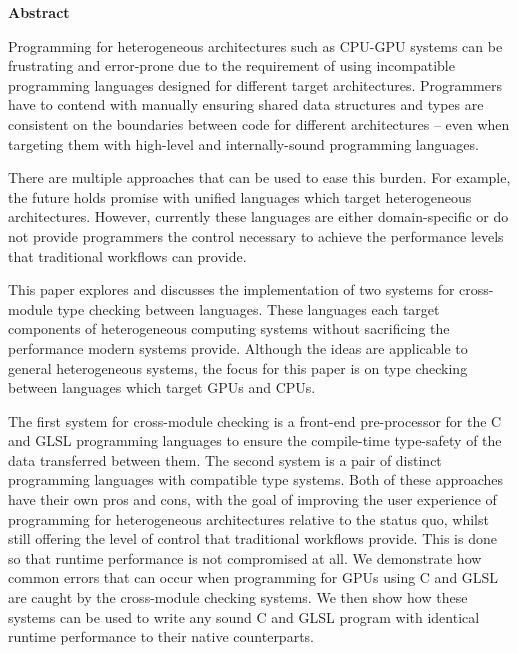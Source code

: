 \newpage
{\Huge \bf Abstract}
\vspace{24pt}






Programming for heterogeneous architectures such as CPU-GPU systems can be
frustrating and error-prone due to the requirement of using incompatible
programming languages designed for different target architectures. Programmers
have to contend with manually ensuring shared data structures and types are
consistent on the boundaries between code for different architectures -- even
when targeting them with high-level and internally-sound programming languages.

There are multiple approaches that can be used to ease this burden. For
example, the future holds promise with unified languages which target
heterogeneous architectures. However, currently these languages are either
domain-specific or do not provide programmers the control necessary to achieve
the performance levels that traditional workflows can provide.

This paper explores and discusses the implementation of two systems for
cross-module type checking between languages. These languages each target
components of heterogeneous computing systems without sacrificing the
performance modern systems provide. Although the ideas are applicable to
general heterogeneous systems, the focus for this paper is on type checking
between languages which target GPUs and CPUs.

The first system for cross-module checking is a front-end pre-processor for the
C and GLSL programming languages to ensure the compile-time type-safety of the
data transferred between them. The second system is a pair of distinct
programming languages with compatible type systems. Both of these approaches
have their own pros and cons, with the goal of improving the user experience of
programming for heterogeneous architectures relative to the status quo, whilst
still offering the level of control that traditional workflows provide. This is
done so that runtime performance is not compromised at all. We demonstrate how
common errors that can occur when programming for GPUs using C and GLSL are
caught by the cross-module checking systems. We then show how these systems can
be used to write any sound C and GLSL program with identical runtime
performance to their native counterparts.

\newpage
\vspace*{\fill}
